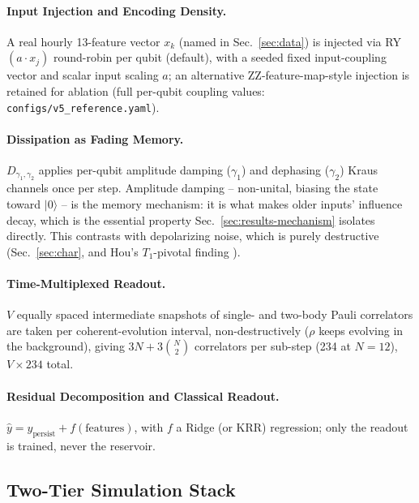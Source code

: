 \documentclass[11pt]{article}
\begin{document}
\paragraph{Input Injection and Encoding Density.}

A real hourly 13-feature vector $x_k$ (named in Sec.~\ref{sec:data}) is injected via
RY$(a\cdot x_j)$ round-robin per qubit (default), with a seeded fixed input-coupling vector and
scalar input scaling $a$; an alternative ZZ-feature-map-style injection is retained for ablation
(full per-qubit coupling values: \texttt{configs/v5\_reference.yaml}).

\paragraph{Dissipation as Fading Memory.}

$D_{\gamma_1,\gamma_2}$ applies per-qubit amplitude damping ($\gamma_1$) and dephasing
($\gamma_2$) Kraus channels once per step. Amplitude damping -- non-unital, biasing the state
toward $|0\rangle$ -- is the memory mechanism: it is what makes older inputs' influence decay,
which is the essential property Sec.~\ref{sec:results-mechanism} isolates directly. This
contrasts with depolarizing noise, which is purely destructive (Sec.~\ref{sec:char}, and Hou's
$T_1$-pivotal finding \cite{hou}).

\paragraph{Time-Multiplexed Readout.}

$V$ equally spaced intermediate snapshots of single- and two-body Pauli correlators are taken per
coherent-evolution interval, non-destructively ($\rho$ keeps evolving in the background), giving
$3N+3\binom{N}{2}$ correlators per sub-step (234 at $N{=}12$), $V\times234$ total.

\paragraph{Residual Decomposition and Classical Readout.}

$\hat y = y_{\text{persist}} + f(\text{features})$, with $f$ a Ridge (or KRR) regression; only the
readout is trained, never the reservoir.

\subsection{Two-Tier Simulation Stack}
\label{sec:stack}
\end{document}
